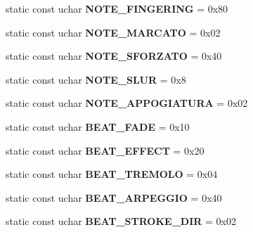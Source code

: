 \begin{DoxyCompactItemize}
static const uchar {\bfseries N\+O\+T\+E\+\_\+\+F\+I\+N\+G\+E\+R\+I\+NG} = 0x80
\item 
\mbox{\label{class_ms_1_1_guitar_pro_aa9c4f1b0b203a7de77e9acae2f50fae1}} 
static const uchar {\bfseries N\+O\+T\+E\+\_\+\+M\+A\+R\+C\+A\+TO} = 0x02
\item 
\mbox{\label{class_ms_1_1_guitar_pro_a608e35cfa5d8b85ed1c904d45aaf1afd}} 
static const uchar {\bfseries N\+O\+T\+E\+\_\+\+S\+F\+O\+R\+Z\+A\+TO} = 0x40
\item 
\mbox{\label{class_ms_1_1_guitar_pro_a856691d04e6a5d5d430bcd8bb56a5ff1}} 
static const uchar {\bfseries N\+O\+T\+E\+\_\+\+S\+L\+UR} = 0x8
\item 
\mbox{\label{class_ms_1_1_guitar_pro_a3d0df4b36c1bedaf39fc06102afa39a4}} 
static const uchar {\bfseries N\+O\+T\+E\+\_\+\+A\+P\+P\+O\+G\+I\+A\+T\+U\+RA} = 0x02
\item 
\mbox{\label{class_ms_1_1_guitar_pro_af628594a0a85d2c4620d821365408a8b}} 
static const uchar {\bfseries B\+E\+A\+T\+\_\+\+F\+A\+DE} = 0x10
\item 
\mbox{\label{class_ms_1_1_guitar_pro_a3230ff27be824e03fc31f91cb73c54d5}} 
static const uchar {\bfseries B\+E\+A\+T\+\_\+\+E\+F\+F\+E\+CT} = 0x20
\item 
\mbox{\label{class_ms_1_1_guitar_pro_a7ed4ec73750506002f56495c9db64205}} 
static const uchar {\bfseries B\+E\+A\+T\+\_\+\+T\+R\+E\+M\+O\+LO} = 0x04
\item 
\mbox{\label{class_ms_1_1_guitar_pro_adc08010203ae862ca4ef14b35f45ef05}} 
static const uchar {\bfseries B\+E\+A\+T\+\_\+\+A\+R\+P\+E\+G\+G\+IO} = 0x40
\item 
\mbox{\label{class_ms_1_1_guitar_pro_a5cf7647c6c40497b87ca60292cb7f6dc}} 
static const uchar {\bfseries B\+E\+A\+T\+\_\+\+S\+T\+R\+O\+K\+E\+\_\+\+D\+IR} = 0x02
\item 
\mbox{\label{class_ms_1_1_guitar_pro_afcff3199ea32579a2a31b3eb50546946}} 

\end{DoxyCompactItemize}
